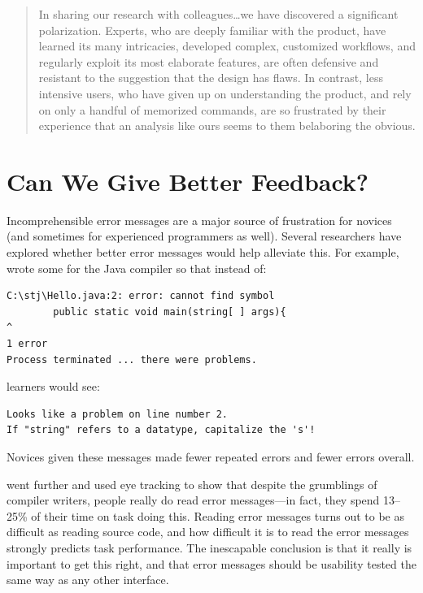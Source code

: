 \begin{quote}

  In sharing our research with colleagues{\ldots}we have discovered a
  significant polarization. Experts, who are deeply familiar with the
  product, have learned its many intricacies, developed complex,
  customized workflows, and regularly exploit its most elaborate
  features, are often defensive and resistant to the suggestion that
  the design has flaws. In contrast, less intensive users, who have
  given up on understanding the product, and rely on only a handful of
  memorized commands, are so frustrated by their experience that an
  analysis like ours seems to them belaboring the obvious.

\end{quote}

\section{Can We Give Better Feedback?}\label{s:pck-error}

Incomprehensible error messages are a major source of frustration for
novices (and sometimes for experienced programmers as well).  Several
researchers have explored whether better error messages would help
alleviate this.  For example, \cite{Beck2016} wrote some for the Java
compiler so that instead of:

\begin{verbatim}
C:\stj\Hello.java:2: error: cannot find symbol
        public static void main(string[ ] args){
^
1 error
Process terminated ... there were problems.
\end{verbatim}

\noindent
learners would see:

\begin{verbatim}
Looks like a problem on line number 2.
If "string" refers to a datatype, capitalize the 's'!
\end{verbatim}

\noindent
Novices given these messages made fewer repeated errors and fewer
errors overall.

\cite{Bari2017} went further and used eye tracking to show that
despite the grumblings of compiler writers, people really do read
error messages---in fact, they spend 13--25\% of their time on task
doing this.  Reading error messages turns out to be as difficult as
reading source code, and how difficult it is to read the error
messages strongly predicts task performance.  The inescapable
conclusion is that it really is important to get this right, and that
error messages should be usability tested the same way as any other
interface.

